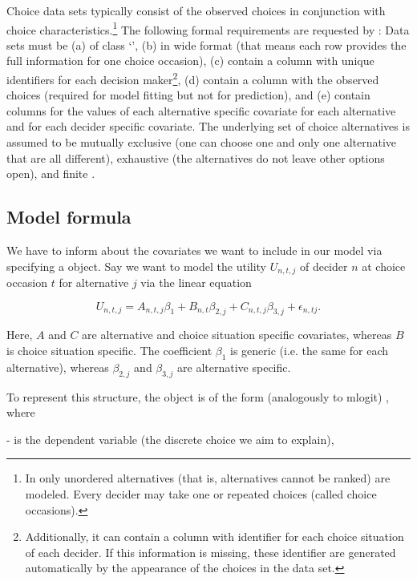 \documentclass[article]{jss}
\newcommand{\class}[1]{`\code{#1}'}
\begin{document}
Choice data sets typically consist of the observed choices in conjunction with choice characteristics.\footnote{In  only unordered alternatives (that is, alternatives cannot be ranked) are modeled. Every decider may take one or repeated choices (called choice occasions).} The following formal requirements are requested by : Data sets must be (a) of class \class{data.frame}, (b) in wide format (that means each row provides the full information for one choice occasion), (c) contain a column with unique identifiers for each decision maker\footnote{Additionally, it can contain a column with identifier for each choice situation of each decider. If this information is missing, these identifier are generated automatically by the appearance of the choices in the data set.}, (d) contain a column with the observed choices (required for model fitting but not for prediction), and (e) contain columns for the values of each alternative specific covariate for each alternative and for each decider specific covariate. The underlying set of choice alternatives is assumed to be mutually exclusive (one can choose one and only one alternative that are all different), exhaustive (the alternatives do not leave other options open), and finite \citep{Train:2009}.

\subsection{Model formula} \label{subsec:model_formula}

We have to inform  about the covariates we want to include in our model via specifying a  object. Say we want to model the utility $U_{n,t,j}$ of decider $n$ at choice occasion $t$ for alternative $j$ via the linear equation

$$U_{n,t,j} = A_{n,t,j} \beta_1 + B_{n,t} \beta_{2,j} + C_{n,t,j} \beta_{3,j} + \epsilon_{n,tj}.$$

Here, $A$ and $C$ are alternative and choice situation specific covariates, whereas $B$ is choice situation specific. The coefficient $\beta_1$ is generic (i.e. the same for each alternative), whereas $\beta_{2,j}$ and $\beta_{3,j}$ are alternative specific.

To represent this structure, the  object is of the form (analogously to {mlogit}) , where

-  is the dependent variable (the discrete choice we aim to explain),
\end{document}
